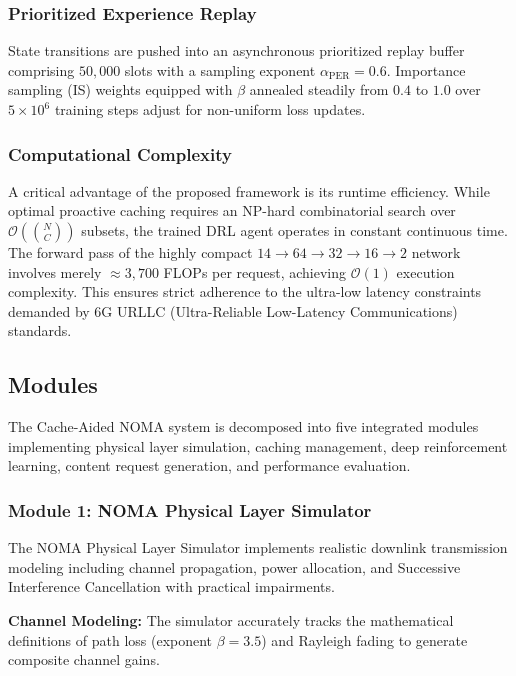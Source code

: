\documentclass[12pt,a4paper]{article}
\begin{document}
\subsubsection{Prioritized Experience Replay}
State transitions are pushed into an asynchronous prioritized replay buffer \cite{b_schaul_per} comprising $50,000$ slots with a sampling exponent $\alpha_{\text{PER}} = 0.6$. Importance sampling (IS) weights equipped with $\beta$ annealed steadily from $0.4$ to $1.0$ over $5\times 10^6$ training steps adjust for non-uniform loss updates.

\subsubsection{Computational Complexity}
A critical advantage of the proposed framework is its runtime efficiency. While optimal proactive caching requires an NP-hard combinatorial search over $\mathcal{O}\left(\binom{N}{C}\right)$ subsets, the trained DRL agent operates in constant continuous time. The forward pass of the highly compact $14 \rightarrow 64 \rightarrow 32 \rightarrow 16 \rightarrow 2$ network involves merely $\approx 3{,}700$ FLOPs per request, achieving $\mathcal{O}(1)$ execution complexity. This ensures strict adherence to the ultra-low latency constraints demanded by 6G URLLC (Ultra-Reliable Low-Latency Communications) standards.



\subsection{Modules}

The Cache-Aided NOMA system is decomposed into five integrated modules implementing physical layer simulation, caching management, deep reinforcement learning, content request generation, and performance evaluation.

\subsubsection{Module 1: NOMA Physical Layer Simulator}

The NOMA Physical Layer Simulator implements realistic downlink transmission modeling including channel propagation, power allocation, and Successive Interference Cancellation with practical impairments.

\textbf{Channel Modeling:} The simulator accurately tracks the mathematical definitions of path loss (exponent $\beta=3.5$) and Rayleigh fading to generate composite channel gains.
\end{document}
